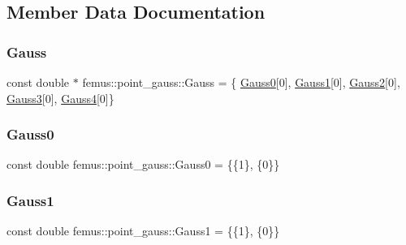 \subsection{Member Data Documentation}
\mbox{\label{classfemus_1_1point__gauss_a4b4a8c7238c2afceb2bd675078faf158}} 
\subsubsection{\texorpdfstring{Gauss}{Gauss}}
{\footnotesize\ttfamily const double $\ast$ femus\+::point\+\_\+gauss\+::\+Gauss = \{ \mbox{\hyperlink{classfemus_1_1point__gauss_a7d58ad8603165947d21825ff1b749022}{Gauss0}}\mbox{[}0\mbox{]}, \mbox{\hyperlink{classfemus_1_1point__gauss_a670df080f9698bfc001f7a4d73945d05}{Gauss1}}\mbox{[}0\mbox{]}, \mbox{\hyperlink{classfemus_1_1point__gauss_a36d21b08eb50ca64956edb66a15edfd9}{Gauss2}}\mbox{[}0\mbox{]}, \mbox{\hyperlink{classfemus_1_1point__gauss_aaf1e339b9fa2ed9e3c798923ed37e58b}{Gauss3}}\mbox{[}0\mbox{]}, \mbox{\hyperlink{classfemus_1_1point__gauss_a6ad1647700b72dfa4f243736cead6d2a}{Gauss4}}\mbox{[}0\mbox{]}\}\hspace{0.3cm}{\ttfamily [static]}}

\mbox{\label{classfemus_1_1point__gauss_a7d58ad8603165947d21825ff1b749022}} 
\subsubsection{\texorpdfstring{Gauss0}{Gauss0}}
{\footnotesize\ttfamily const double femus\+::point\+\_\+gauss\+::\+Gauss0 = \{\{1\}, \{0\}\}\hspace{0.3cm}{\ttfamily [static]}}

\mbox{\label{classfemus_1_1point__gauss_a670df080f9698bfc001f7a4d73945d05}} 
\subsubsection{\texorpdfstring{Gauss1}{Gauss1}}
{\footnotesize\ttfamily const double femus\+::point\+\_\+gauss\+::\+Gauss1 = \{\{1\}, \{0\}\}\hspace{0.3cm}{\ttfamily [static]}}


